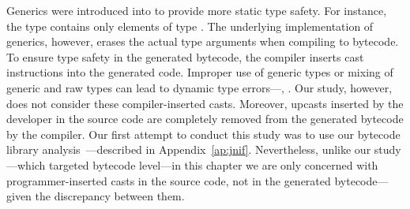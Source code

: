 Generics were introduced into \java{} to provide more static type safety.
For instance, the type  contains only elements of type .
The underlying implementation of generics, however,
erases the actual type arguments when compiling to bytecode.
To ensure type safety in the generated bytecode,
the compiler inserts cast instructions into the generated code.
Improper use of generic types or mixing of generic and raw types can lead
to dynamic type errors---\ie, .
Our study, however, does not consider these compiler-inserted casts.
Moreover, upcasts inserted by the developer in the source code are completely removed from the generated bytecode by the compiler.
Our first attempt to conduct this study was to use our bytecode library
analysis~\citep{mastrangeloJNIFJavaNative2014}---described in Appendix~\ref{ap:jnif}.
Nevertheless, unlike our \unsafe{} study---which targeted \java{} bytecode level---in this chapter we are only concerned with programmer-inserted casts in the source code,
not in the generated bytecode---given the discrepancy between them.
